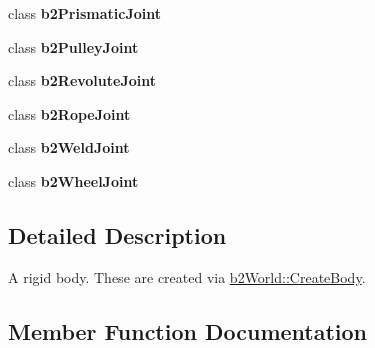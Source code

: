 \begin{DoxyCompactItemize}
\item 
class {\bfseries b2\+Prismatic\+Joint}\hypertarget{classb2_body_a78ff31fe08bbb0c83ad03ba6dfb9d78c}{}\label{classb2_body_a78ff31fe08bbb0c83ad03ba6dfb9d78c}

\item 
class {\bfseries b2\+Pulley\+Joint}\hypertarget{classb2_body_af7861e214216f26a70b7596130e0326f}{}\label{classb2_body_af7861e214216f26a70b7596130e0326f}

\item 
class {\bfseries b2\+Revolute\+Joint}\hypertarget{classb2_body_aa6afb0f5dc73f101a6fc3a3c63abedf8}{}\label{classb2_body_aa6afb0f5dc73f101a6fc3a3c63abedf8}

\item 
class {\bfseries b2\+Rope\+Joint}\hypertarget{classb2_body_ab24edbcb929fa9bd24b92d6006c00ab2}{}\label{classb2_body_ab24edbcb929fa9bd24b92d6006c00ab2}

\item 
class {\bfseries b2\+Weld\+Joint}\hypertarget{classb2_body_a9fafe51e7203fdb53358c75e1c41142b}{}\label{classb2_body_a9fafe51e7203fdb53358c75e1c41142b}

\item 
class {\bfseries b2\+Wheel\+Joint}\hypertarget{classb2_body_a715f06ed5bb576994cd50d0b99cc18ec}{}\label{classb2_body_a715f06ed5bb576994cd50d0b99cc18ec}

\end{DoxyCompactItemize}


\subsection{Detailed Description}
A rigid body. These are created via \hyperlink{classb2_world_a9323d553e4c132b26d8741b457d7c034}{b2\+World\+::\+Create\+Body}. 

\subsection{Member Function Documentation}
